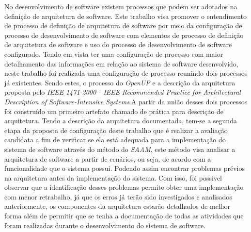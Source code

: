 No desenvolvimento de software existem processos que podem ser adotados na definição de arquitetura de software. Este trabalho visa promover o entendimento de processo de definição de arquitetura de software por meio da configuração de processo de desenvolvimento de software com elementos de processo de definição de arquitetura de software e uso do processo de desenvolvimento de software configurado. Tendo em vista ter uma configuração de processo com maior detalhamento das informações em relação ao sistema de software desenvolvido, neste trabalho foi realizada uma configuração de processo  reunindo dois processos já existentes. Sendo estes, o processo do \emph{\acrfull{OpenUP}} e a descrição da arquitetura proposta pelo \emph{IEEE 1471-2000 - IEEE Recommended Practice for Architectural Description of Software-Intensive Systems}.A partir da união desses dois processos foi construído um primeiro artefato chamado de  prática para descrição de arquitetura. Tendo a descrição da arquitetura documentada, tem-se a segunda etapa da proposta de configuração deste trabalho que é realizar a avaliação candidata a fim de verificar se ela está adequada para a implementação do sistema de software através do método do \emph{\acrfull{SAAM}}, este método visa analisar a arquitetura de software a partir de cenários, ou seja, de acordo com a funcionalidade que o sistema possui. Podendo assim encontrar problemas prévios na arquitetura antes da implementação do sistema. Com isso, foi possível observar que a identificação desses problemas permite obter uma implementação com menor retrabalho, já que os erros já terão sido investigados e analisados anteriormente, os componentes da arquitetura estarão detalhados de melhor forma além de permitir que se tenha a documentação de todas as atividades que foram realizadas durante o desenvolvimento do sistema de software.